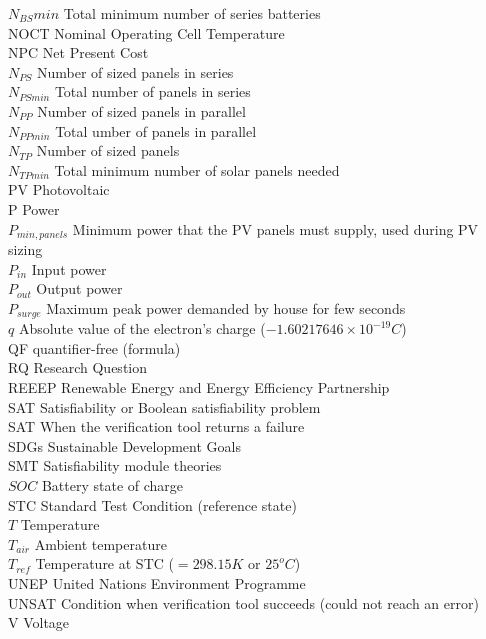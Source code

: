 $N_{BS}min$ Total minimum number of series batteries \\
NOCT Nominal Operating Cell Temperature \\
NPC  Net Present Cost \\
$N_{PS}$ Number of sized panels in series \\
$N_{PSmin}$ Total number of panels in series \\
$N_{PP}$ Number of sized panels in parallel \\
$N_{PPmin}$ Total umber of panels in parallel \\
$ N_{TP} $ Number of sized panels \\
$N_{TPmin}$ Total minimum number of solar panels needed \\
PV Photovoltaic \\
P Power \\
$P_{min,panels}$ Minimum power that the PV panels must supply, used during PV sizing \\
$P_{in}$ Input power \\
$P_{out}$ Output power \\
$P_{surge}$ Maximum peak power demanded by house for few seconds \\
$q$ Absolute value of the electron's charge ($ -1.60217646\times10^{-19}C $) \\
QF  quantifier-free (formula) \\
RQ Research Question \\
REEEP Renewable Energy and Energy Efficiency Partnership \\
SAT Satisfiability or Boolean satisfiability problem \\
SAT When the verification tool returns a failure \\
SDGs Sustainable Development Goals \\
SMT Satisfiability module theories \\
$ SOC $ Battery state of charge \\
STC Standard Test Condition (reference state) \\
$T$ Temperature \\
$ T_{air} $ Ambient temperature \\
$ T_{ref}$ Temperature at STC ($=298.15 K$ or $25^{o}C$) \\
UNEP United Nations Environment Programme \\
UNSAT Condition when verification tool succeeds (could not reach an error) \\
V Voltage \\
